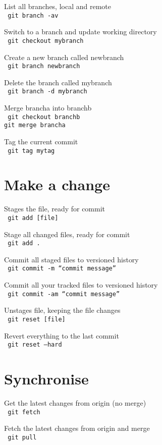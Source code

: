 \documentclass[a4paper, twoside, 11pt]{extarticle}
\begin{document}
\begin{multicols*}{2}
List all branches, local and remote \\ \texttt{\color{blue} git branch -av}

Switch to a branch and update working directory \\ \texttt{\color{blue} git checkout mybranch}

Create a new branch called newbranch \\ \texttt{\color{blue} git branch newbranch}

Delete the branch called mybranch \\ \texttt{\color{blue} git branch -d mybranch}

Merge brancha into branchb \\ \texttt{\color{blue} git checkout branchb\\git merge brancha}

Tag the current commit \\ \texttt{\color{blue} git tag mytag}

\section{Make a change}
Stages the file, ready for commit \\ \texttt{\color{blue} git add [file]}

Stage all changed files, ready for commit \\ \texttt{\color{blue} git add .}

Commit all staged files to versioned history \\ \texttt{\color{blue} git commit -m “commit message”}

Commit all your tracked files to
versioned history \\ \texttt{\color{blue} git commit -am “commit message”}

Unstages file, keeping the file changes \\ \texttt{\color{blue} git reset [file]}

Revert everything to the last commit \\ \texttt{\color{blue} git reset --hard}

\section{Synchronise}
Get the latest changes from origin
(no merge) \\ \texttt{\color{blue} git fetch}

Fetch the latest changes from origin
and merge \\ \texttt{\color{blue} git pull}


\end{multicols*}
\end{document}
